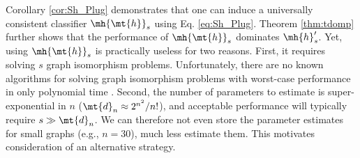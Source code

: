 \documentclass[10pt,journal,cspaper,compsoc]{IEEEtran}
\begin{document}
Corollary \ref{cor:Sh_Plug} demonstrates that one can induce a universally consistent classifier $\mh{\mt{h}}_s$  using Eq. \eqref{eq:Sh_Plug}. Theorem \ref{thm:tdomp} further shows that the performance of $\mh{\mt{h}}_s$ dominates $\mh{h}_s'$.  Yet, using $\mh{\mt{h}}_s$ is practically useless for two reasons.  First, it requires solving $s$ graph isomorphism problems. Unfortunately, there are no known algorithms for solving graph isomorphism problems with worst-case performance in only polynomial time \cite{Fortin1996}. Second, the number of parameters to estimate is super-exponential in $n$ ($\mt{d}_n \approx 2^{n^2}/n!$), and acceptable performance will typically require $s \gg \mt{d}_n$.  We can therefore not even store the parameter estimates for small graphs (e.g., $n=30$), much less estimate them.  
This motivates consideration of an alternative strategy.
\end{document}
